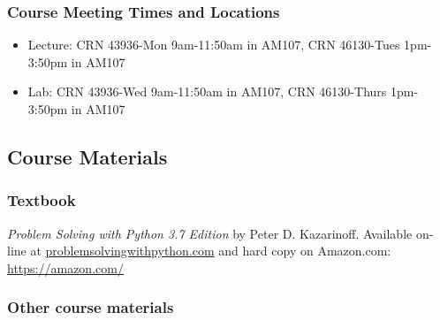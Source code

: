 \documentclass[11pt]{article}
\providecommand{\tightlist}{%
      \setlength{\itemsep}{0pt}\setlength{\parskip}{0pt}}
\begin{document}
\hypertarget{course-meeting-times-and-locations}{%
\subsubsection{Course Meeting Times and
Locations}\label{course-meeting-times-and-locations}}

\begin{itemize}
\tightlist
\item
  Lecture: CRN 43936-Mon 9am-11:50am in AM107, CRN 46130-Tues 1pm-3:50pm
  in AM107
\item
  Lab: CRN 43936-Wed 9am-11:50am in AM107, CRN 46130-Thurs 1pm-3:50pm in
  AM107
\end{itemize}

\hypertarget{course-materials}{%
\subsection{Course Materials}\label{course-materials}}

\hypertarget{textbook}{%
\subsubsection{Textbook}\label{textbook}}

\emph{Problem Solving with Python 3.7 Edition} by Peter D. Kazarinoff.
Available on-line at
\href{https://problemsolvingwithpython.com/}{problemsolvingwithpython.com}
and hard copy on Amazon.com: \url{https://amazon.com/}

\hypertarget{other-course-materials}{%
\subsubsection{Other course materials}\label{other-course-materials}}
\end{document}
